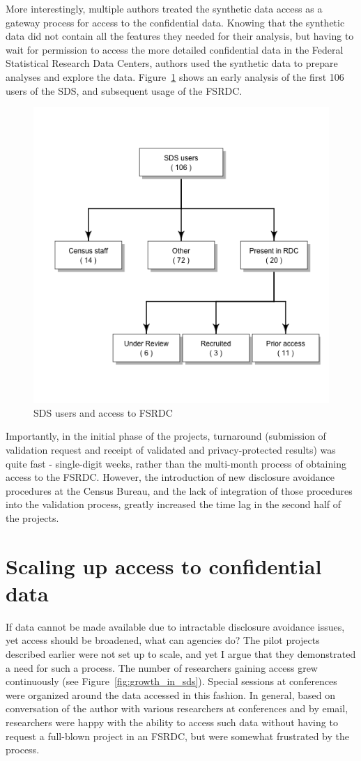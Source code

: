 \documentclass{article}
\begin{document}
More interestingly, multiple authors treated the synthetic data access as a gateway process for access to the confidential data. Knowing that the synthetic data did not contain all the features they needed for their analysis, but having to wait for permission to access the more detailed confidential data in the Federal Statistical Research Data Centers, authors used the synthetic data to prepare analyses and explore the data. Figure~\ref{fig:useRDC} shows an early analysis of the first 106 users of the SDS, and subsequent usage of the FSRDC. 

\begin{figure}
    \centering
    \includegraphics[width=0.5\linewidth]{figs/useRDCgraph.png}
    \caption{SDS users and access to FSRDC}
    \label{fig:useRDC}
\end{figure}

Importantly, in the initial phase of the projects, turnaround (submission of validation request and receipt of validated and privacy-protected results) was quite fast - single-digit weeks, rather than the multi-month process of obtaining access to the FSRDC. However, the introduction of new disclosure avoidance procedures at the Census Bureau, and the lack of integration of those procedures into the validation process, greatly increased the time lag in the second half of the projects.

\section{Scaling up access to confidential data}

If data cannot be made available due to intractable disclosure avoidance issues, yet access should be broadened, what can agencies do? 
The pilot projects described earlier were not set up to scale, and yet I argue that  they demonstrated  a need for such a process. The number of researchers gaining access grew continuously (see Figure~\ref{fig:growth_in_sds}). Special sessions at conferences were organized around the data accessed in this fashion. In general, based on conversation of the author with various researchers at conferences and by email, researchers were happy with the ability to access such data without having to request a full-blown project in an FSRDC, but were somewhat frustrated by the process. 
\end{document}
